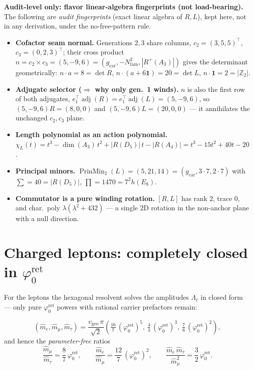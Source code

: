 \documentclass[11pt,a4paper]{article}
\newcommand{\gcar}{g_{\mathrm{car}}}
\newcommand{\Nfam}{N_{\mathrm{fam}}}
\newcommand{\phiz}{\varphi_0^{\mathrm{ret}}}
\newcommand{\Z}{\mathbb{Z}}
\newcommand{\vgeo}{v_{\mathrm{geo}}}
\theoremstyle{definition}
\begin{document}
\par\smallskip\noindent\textbf{Audit-level only: flavor linear-algebra fingerprints (not load-bearing).}
The following are \emph{audit fingerprints} (exact linear algebra of $R,L$), kept here, not in any
derivation, under the no-free-pattern rule. \mE
\begin{itemize}\setlength\itemsep{2pt}
\item\textbf{Cofactor seam normal.} Generations $2,3$ share columns, $c_2{=}(3,5,5)^{\!\top}$,
$c_3{=}(0,2,3)^{\!\top}$; their cross product $n=c_2\times c_3=(5,-9,6)=(\gcar,-\Nfam^2,|R^+(A_3)|)$
gives the determinant geometrically: $n\cdot a=8=\det R$, $n\cdot(a{+}6\mathbf1)=20=\det L$, $n\cdot\mathbf1=2=|\Z_2|$.
\item\textbf{Adjugate selector ($\Rightarrow$ why only gen.\ 1 winds).} $n$ is also the first row of both
adjugates, $e_1^{\!\top}\!\operatorname{adj}(R)=e_1^{\!\top}\!\operatorname{adj}(L)=(5,-9,6)$, so
$(5,-9,6)R=(8,0,0)$ and $(5,-9,6)L=(20,0,0)$ --- it annihilates the unchanged $c_2,c_3$ plane.
\item\textbf{Length polynomial as an action polynomial.}
$\chi_L(t)=t^3-\dim(A_3)\,t^2+|R(D_5)|\,t-|R(A_4)|=t^3-15t^2+40t-20$.
\item\textbf{Principal minors.} $\operatorname{PrinMin}_2(L)=(5,21,14)=(\gcar,3{\cdot}7,2{\cdot}7)$ with
$\sum=40=|R(D_5)|$, $\prod=1470=7^2 h(E_8)$.
\item\textbf{Commutator is a pure winding rotation.} $[R,L]$ has rank $2$, trace $0$, and char.\ poly
$\lambda(\lambda^2+432)$ --- a single $2$D rotation in the non-anchor plane with a null direction.
\end{itemize}
\par\smallskip

\section{Charged leptons: completely closed in $\phiz$}
For the leptons the hexagonal resolvent solves the amplitudes $\Lambda_\ell$ in closed form --- only pure
$\phiz$ powers with rational carrier prefactors remain:

\begin{keybox}
\[
  (\hat m_e,\hat m_\mu,\hat m_\tau)=\frac{\vgeo\,\pi}{\sqrt2}\left(\tfrac{16}{7}\,(\phiz)^{5},\ \tfrac{4}{3}\,(\phiz)^{3},\ \tfrac{7}{6}\,(\phiz)^{2}\right),
\]
and hence the \emph{parameter-free} ratios
\[
  \frac{\hat m_\mu}{\hat m_\tau}=\frac{8}{7}\,\phiz,\qquad
  \frac{\hat m_e}{\hat m_\mu}=\frac{12}{7}\,(\phiz)^{2},\qquad
  \frac{\hat m_e\,\hat m_\tau}{\hat m_\mu^{2}}=\frac{3}{2}\,\phiz .
\]
\end{keybox}
\end{document}

